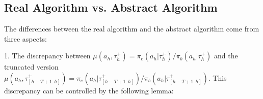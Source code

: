 \documentclass[twoside]{article}
\newtheorem{definition}{Definition}
\newtheorem{condition}{Condition}
\newcommand{\CAL}[1]{\mathcal{#1}}
\begin{document}
\subsection{Real Algorithm vs. Abstract Algorithm}

The differences between the real algorithm and the abstract algorithm come from three aspects:

1. The discrepancy between $\mu(a_h,\tau_h^+) = \pi_e(a_h|\tau_h^+) / \pi_b(a_h|\tau_h^+)$ and the truncated version $\mu(a_h,\tau_{[h-T+1:h]}^+) = \pi_e(a_h|\tau_{[h-T+1:h]}^+) / \pi_b(a_h|\tau_{[h-T+1:h]}^+)$.
This discrepancy can be controlled by the following lemma:
\end{document}
